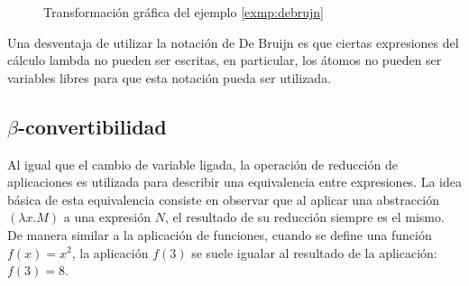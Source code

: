 \begin{figure}
  \centering

  
  \caption{Transformación gráfica del ejemplo \ref{exmp:debrujn}}
  \label{fig:debrujn}
\end{figure}

Una desventaja de utilizar la notación de De Bruijn es que ciertas expresiones del cálculo lambda no pueden ser escritas, en particular, los átomos no pueden ser variables libres para que esta notación pueda ser utilizada.

\subsection{\( β \)-convertibilidad}
\label{sec:beta-convertibildad}

Al igual que el cambio de variable ligada, la operación de reducción de aplicaciones es utilizada para describir una equivalencia entre expresiones. La idea básica de esta equivalencia consiste en observar que al aplicar una abstracción \( (λx.M) \) a una expresión \( N \), el resultado de su reducción siempre es el mismo. De manera similar a la aplicación de funciones, cuando se define una función \( f(x)=x^{2} \), la aplicación \( f(3) \) se suele igualar al resultado de la aplicación: \( f(3)=8 \).

